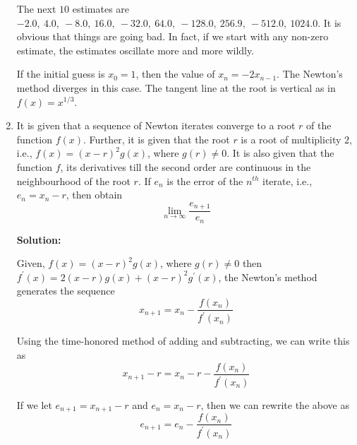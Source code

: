 \documentclass[a4paper,11pt]{report}
\begin{document}
\begin{enumerate}
    The next $10$ estimates are $-2.0,\ 4.0,\ -8.0,\ 16.0,\ -32.0,\ 64.0,\
    -128.0,\ 256.9,\ -512.0,\ 1024.0$. It is obvious that things are going bad.
    In fact, if we start with any non-zero estimate, the estimates oscillate 
    more and more wildly.

    If the initial guess is $x_{0} = 1$, then the value of $x_{n} = -2x_{n-1}$.
    The Newton's method diverges in this case. The tangent line at the root is
    vertical as in $f(x) = x^{1/3}$.


    \item It is given that a sequence of Newton iterates converge to a root 
    $r$ of the function $f(x)$. Further, it is given that the root $r$ is a 
    root of multiplicity $2$, i.e., $f(x) = (x - r)^{2} g(x)$, where $g(r) 
    \ne 0$. It is also given that the function $f$, its derivatives till the 
    second order are continuous in the neighbourhood of the root $r$. If 
    $e_{n}$ is the error of the $n^{th}$ iterate, i.e., $e_{n} = x_{n} - r$, 
    then obtain
    \begin{equation*}
    \lim_{n \rightarrow \infty} \frac{e_{n+1}}{e_{n}}
    \end{equation*}

    \textbf{Solution:}
    
    Given, $f(x) = (x-r)^{2} g(x)$, where $g(r) \ne 0$ then $f^{\prime}(x) = 
    2(x-r) g(x) + (x-r)^{2} g^{\prime}(x)$, the Newton's method generates the 
    sequence
    \begin{equation*}
    x_{n+1} = x_{n} - \frac{f(x_{n})}{f^{\prime}(x_{n})} 
    \end{equation*}

    Using the time-honored method of adding and subtracting, we can write this 
    as
    \begin{equation*}
    x_{n+1} - r = x_{n} - r - \frac{f(x_{n})}{f^{\prime}(x_{n})}
    \end{equation*}
    
    If we let $e_{n+1} = x_{n+1} - r$ and $e_{n} = x_{n} - r$, then we can 
    rewrite the above as
    \begin{equation*}
    e_{n+1} = e_{n} - \frac{f(x_{n})}{f^{\prime}(x_{n})}
    \end{equation*}


\end{enumerate}
\end{document}
